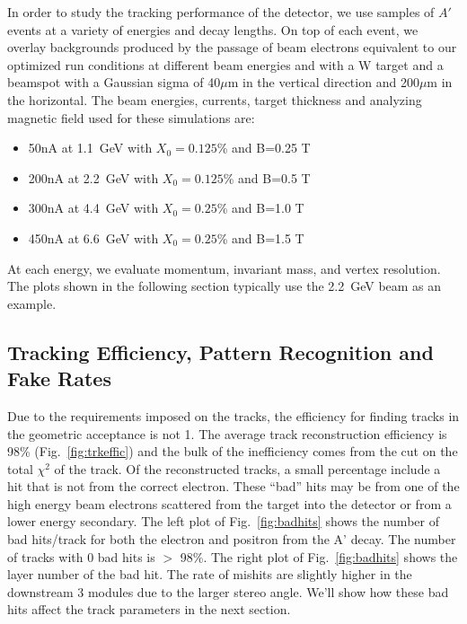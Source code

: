 \label{sec:trkperf}


In order to study the tracking performance of the detector, we use samples of $A'$ events 
at a variety of energies and decay lengths.  On top of each event, we overlay backgrounds 
produced by the passage of  beam electrons equivalent to our optimized run conditions at
different beam energies and with a W target and a beamspot with a Gaussian sigma of 40$\mu$m in the vertical direction and 
200$\mu$m in the horizontal. The beam energies, currents, target thickness and analyzing magnetic field  used for these simulations are:
\begin{itemize}
\item 50nA at 1.1~GeV with $X_0=0.125$\% and  B=0.25 T
\item 200nA at 2.2~GeV with $X_0=0.125$\% and  B=0.5 T
\item 300nA at 4.4~GeV with $X_0=0.25$\% and  B=1.0 T
\item 450nA at 6.6~GeV with $X_0=0.25$\% and  B=1.5 T
\end{itemize}
At each energy, we evaluate momentum, invariant mass, and vertex resolution.  The plots shown in the following section typically use the 2.2~GeV beam as an example.  

\subsection{Tracking Efficiency, Pattern Recognition and Fake Rates}

Due to the requirements imposed on the tracks, the efficiency for finding tracks in the 
geometric acceptance is not 1. The average track reconstruction efficiency is 98\% (Fig.~\ref{fig:trkeffic}) and 
the bulk of the inefficiency comes from the cut on the total $\chi^2$ of the track. 
Of the reconstructed tracks, a small percentage include a hit that is not from 
the correct electron.  These ``bad'' hits may be from one of the high energy beam 
electrons scattered from the target into the detector or from a lower energy secondary.  
The left plot of Fig.~\ref{fig:badhits} shows the number of bad hits/track for both the electron 
and positron from the A' decay.  The number of tracks with 0 bad hits is $>$ 98\%.
The right plot of Fig.~\ref{fig:badhits} shows the layer number of the bad hit.  
The rate of mishits are slightly higher in the downstream 3 modules due to the larger stereo angle. %
We'll show how these bad hits affect the track parameters in the next section.


